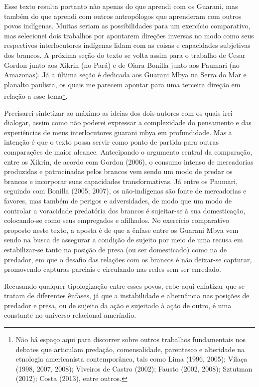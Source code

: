 Esse texto resulta portanto não apenas do que aprendi com os Guarani,
mas também do que aprendi com outros antropólogos que aprenderam com
outros povos indígenas. Muitas seriam as possibilidades para um
exercício comparativo, mas selecionei dois trabalhos por apontarem
direções inversas no modo como seus respectivos interlocutores indígenas
lidam com as coisas e capacidades subjetivas dos brancos. A próxima
seção do texto se volta assim para o trabalho de Cesar Gordon junto aos
Xikrin (no Pará) e de Oiara Bonilla junto aos Paumari (no Amazonas). Já
a última seção é dedicada aos Guarani Mbya na Serra do Mar e planalto
paulista, os quais me parecem apontar para uma terceira direção em
relação a esse tema\footnote{Não há espaço aqui para discorrer sobre
  outros trabalhos fundamentais nos debates que articulam predação,
  comensalidade, parentesco e alteridade na etnologia americanista
  contemporânea, tais como Lima (1996, 2005); Vilaça (1998, 2007, 2008);
  Viveiros de Castro (2002); Fausto (2002, 2008); Sztutman (2012); Costa
  (2013), entre outros.}.

Precisarei sintetizar ao máximo as ideias dos dois autores com os quais
irei dialogar, assim como não poderei expressar a complexidade do
pensamento e das experiências de meus interlocutores guarani mbya em
profundidade. Mas a intenção é que o texto possa servir como ponto de
partida para outras comparações de maior alcance. Antecipando o
argumento central da comparação, entre os Xikrin, de acordo com Gordon
(2006), o consumo intenso de mercadorias produzidas e patrocinadas pelos
brancos vem sendo um modo de predar os brancos e incorporar suas
capacidades transformativas. Já entre os Paumari, seguindo com Bonilla
(2005; 2007), os não-indígenas são fonte de mercadorias e favores, mas
também de perigos e adversidades, de modo que um modo de controlar a
voracidade predatória dos brancos é sujeitar-se à sua domesticação,
colocando-se como seus empregados e afilhados. No exercício comparativo
proposto neste texto, a aposta é de que a ênfase entre os Guarani Mbya
vem sendo na busca de assegurar a condição de sujeito por meio de uma
recusa em estabilizar-se tanto na posição de presa (ou ser domesticado)
como na de predador, em que o desafio das relações com os brancos é não
deixar-se capturar, promovendo capturas parciais e circulando nas redes
sem ser enredado.

Recusando qualquer tipologização entre esses povos, cabe aqui enfatizar
que se tratam de diferentes ênfases, já que a instabilidade e
alternância nas posições de predador e presa, ou de sujeito da ação e
sujeitado à ação de outro, é uma constante no universo relacional
ameríndio.

